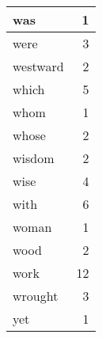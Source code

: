 \begin{center}
\begin{longtable}{l|r}
was & 1 \\ \hline
were & 3 \\ \hline
westward & 2 \\ \hline
which & 5 \\ \hline
whom & 1 \\ \hline
whose & 2 \\ \hline
wisdom & 2 \\ \hline
wise & 4 \\ \hline
with & 6 \\ \hline
woman & 1 \\ \hline
wood & 2 \\ \hline
work & 12 \\ \hline
wrought & 3 \\ \hline
yet & 1 \\ \hline
\end{longtable}
\end{center}



\normalsize



